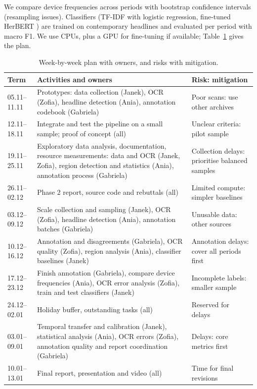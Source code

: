 \documentclass[11pt]{article}
\begin{document}
We compare device frequencies across periods with bootstrap confidence intervals (resampling issues). Classifiers (TF-IDF with logistic regression, fine-tuned HerBERT \cite{mroczkowski2021herbert}) are trained on contemporary headlines and evaluated per period with macro F1. We use CPUs, plus a GPU for fine-tuning if available; Table~\ref{tab:project_timeline} gives the plan.

\begin{table}[!t]
\centering
\scriptsize
\setlength{\tabcolsep}{3pt}
\begin{tabular}{@{}p{0.8cm} p{4.1cm} p{2.35cm}@{}}
\hline
\textbf{Term} & \textbf{Activities and owners} & \textbf{Risk: mitigation} \\
\hline
05.11--11.11 & Prototypes: data collection (Janek), OCR (Zofia), headline detection (Ania), annotation codebook (Gabriela) & Poor scans: use other archives \\
12.11--18.11 & Integrate and test the pipeline on a small sample; proof of concept (all) & Unclear criteria: pilot sample \\
19.11--25.11 & Exploratory data analysis, documentation, resource measurements: data and OCR (Janek, Zofia), region detection and statistics (Ania), annotation process (Gabriela) & Collection delays: prioritise balanced samples \\
26.11--02.12 & Phase 2 report, source code and rebuttals (all) & Limited compute: simpler baselines \\
03.12--09.12 & Scale collection and sampling (Janek), OCR (Zofia), headline detection (Ania), annotation batches (Gabriela) & Unusable data: other sources \\
10.12--16.12 & Annotation and disagreements (Gabriela), OCR quality (Zofia), region analysis (Ania), classifier baselines (Janek) & Annotation delays: cover all periods first \\
17.12--23.12 & Finish annotation (Gabriela), compare device frequencies (Ania), OCR error analysis (Zofia), train and test classifiers (Janek) & Incomplete labels: smaller sample \\
24.12--02.01 & Holiday buffer, outstanding tasks (all) & Reserved for delays \\
03.01--09.01 & Temporal transfer and calibration (Janek), statistical analysis (Ania), OCR errors (Zofia), annotation quality and report coordination (Gabriela) & Delays: core metrics first \\
10.01--13.01 & Final report, presentation and video (all) & Time for final revisions \\
\hline
\end{tabular}
\caption{Week-by-week plan with owners, and risks with mitigation.}
\label{tab:project_timeline}
\end{table}
\end{document}
